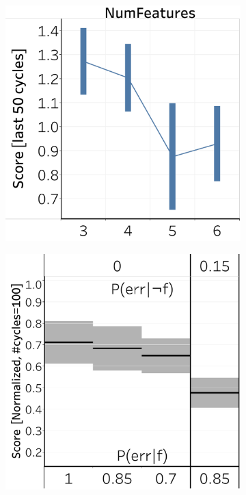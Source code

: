\documentclass[letterpaper]{article} %
\newcommand{\?}{\mbox{?}}
\begin{document}
\begin{figure}[t]
  \centering
  \begin{subfigure}[b]{.47\columnwidth}
    \centering
    \includegraphics[width=\columnwidth]{2a.pdf}
    \caption{}
    \label{fig:complexity_nonstochastic}
  \end{subfigure}
  \hfill
  \begin{subfigure}[b]{.47\columnwidth}
  \centering
    \includegraphics[width=\columnwidth]{2b.pdf}

\end{subfigure}
\end{figure}
\end{document}

